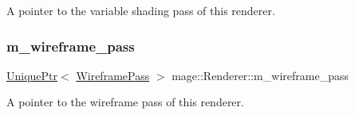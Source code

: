 A pointer to the variable shading pass of this renderer. \hypertarget{classmage_1_1_renderer_a8c9f28228031337e26725af8213268ed}{}\label{classmage_1_1_renderer_a8c9f28228031337e26725af8213268ed} 
\subsubsection{\texorpdfstring{m\+\_\+wireframe\+\_\+pass}{m\_wireframe\_pass}}
{\footnotesize\ttfamily \hyperlink{namespacemage_a3316d7143a973e37adf1110f2e80ca31}{Unique\+Ptr}$<$ \hyperlink{classmage_1_1_wireframe_pass}{Wireframe\+Pass} $>$ mage\+::\+Renderer\+::m\+\_\+wireframe\+\_\+pass\hspace{0.3cm}{\ttfamily [private]}}

A pointer to the wireframe pass of this renderer. 